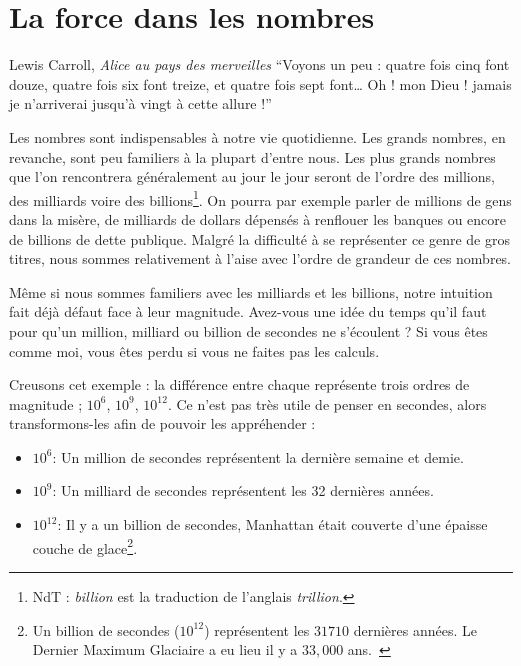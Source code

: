\chapter{La force dans les nombres}
\label{les:15}

\begin{chapquote}{Lewis Carroll, \textit{Alice au pays des merveilles}}
\enquote{Voyons un peu : quatre fois cinq font douze, quatre fois six font
treize, et quatre fois sept font… Oh ! mon Dieu ! jamais je n’arriverai jusqu’à
vingt à cette allure !}
\end{chapquote}

Les nombres sont indispensables à notre vie quotidienne. Les grands nombres, en
revanche, sont peu familiers à la plupart d'entre nous. Les plus grands nombres
que l'on rencontrera généralement au jour le jour seront de l'ordre des
millions, des milliards voire des billions\footnote{NdT : \textit{billion} est
la traduction de l'anglais \textit{trillion}.}. On pourra par exemple parler de
millions de gens dans la misère, de milliards de dollars dépensés à renflouer
les banques ou encore de billions de dette publique. Malgré la difficulté à se
représenter ce genre de gros titres, nous sommes relativement à l'aise avec
l'ordre de grandeur de ces nombres.

Même si nous sommes familiers avec les milliards et les billions, notre
intuition fait déjà défaut face à leur magnitude. Avez-vous une idée du temps
qu'il faut pour qu'un million, milliard ou billion de secondes ne s'écoulent ?
Si vous êtes comme moi, vous êtes perdu si vous ne faites pas les calculs.

Creusons cet exemple : la différence entre chaque représente trois ordres de
magnitude ; $10^6$, $10^9$, $10^{12}$. Ce n'est pas très utile de penser en
secondes, alors transformons-les afin de pouvoir les appréhender :

\begin{itemize}
  \item $10^6$: Un million de secondes représentent la dernière semaine et demie.
  \item $10^9$: Un milliard de secondes représentent les 32 dernières années.
  \item $10^{12}$: Il y a un billion de secondes, Manhattan était couverte d'une
  épaisse couche de glace\footnote{Un billion de secondes ($10^{12}$)
  représentent les $31710$ dernières années. Le Dernier Maximum Glaciaire a eu
  lieu il y a $33,000$ ans.~\cite{wiki:LGM}}.
\end{itemize}


